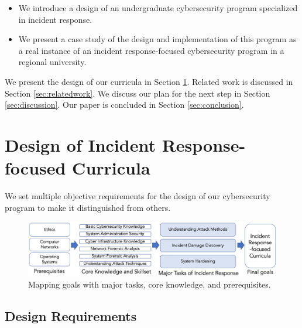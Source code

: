 \documentclass{article}
\begin{document}
\begin{itemize}
    \item We introduce a design of an undergraduate cybersecurity program specialized in incident response.
    
    
    \item We present a case study of the design and implementation of this program as a real instance of an incident response-focused cybersecurity program in a regional university.
    
\end{itemize}

We present the design of our curricula in Section \ref{sec:design}.
Related work is discussed in Section \ref{sec:relatedwork}. We discuss our plan for the next step in Section \ref{sec:discussion}. Our paper is concluded in Section \ref{sec:conclusion}.

\section{Design of Incident Response-focused Curricula}
\label{sec:design}


We set multiple objective requirements for the design of our cybersecurity program to make it distinguished from others.

\begin{figure}[t]
\includegraphics[width=\textwidth]{2648_1.png}
\centering
\caption{Mapping goals with major tasks, core knowledge, and prerequisites.}
\label{fig1}
\end{figure}

\subsection{Design Requirements}
\end{document}
